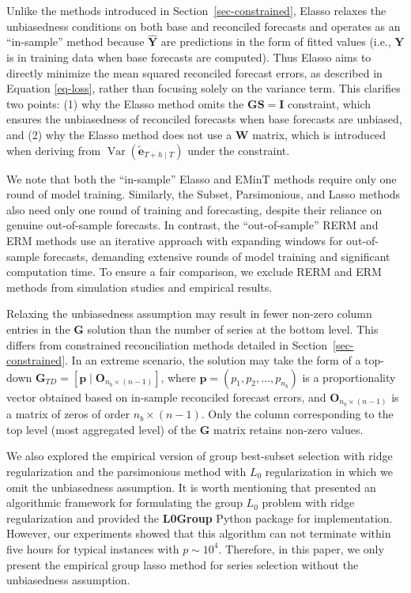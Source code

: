 \documentclass[
  11pt]{article}
\theoremstyle{plain}
\theoremstyle{remark}
\begin{document}
Unlike the methods introduced in Section~\ref{sec-constrained}, Elasso
relaxes the unbiasedness conditions on both base and reconciled
forecasts and operates as an ``in-sample'' method because
\(\hat{\bm{Y}}\) are predictions in the form of fitted values (i.e.,
\(\bm{Y}\) is in training data when base forecasts are computed). Thus
Elasso aims to directly minimize the mean squared reconciled forecast
errors, as described in Equation \eqref{eq-loss}, rather than focusing
solely on the variance term. This clarifies two points: (1) why the
Elasso method omits the \(\bm{GS}=\bm{I}\) constraint, which ensures the
unbiasedness of reconciled forecasts when base forecasts are unbiased,
and (2) why the Elasso method does not use a \(\bm{W}\) matrix, which is
introduced when deriving from
\(\operatorname{Var}(\tilde{\bm{e}}_{T+h \mid T})\) under the
constraint.

We note that both the ``in-sample'' Elasso and EMinT methods require
only one round of model training. Similarly, the Subset, Parsimonious,
and Lasso methods also need only one round of training and forecasting,
despite their reliance on genuine out-of-sample forecasts. In contrast,
the ``out-of-sample'' RERM and ERM methods use an iterative approach
with expanding windows for out-of-sample forecasts, demanding extensive
rounds of model training and significant computation time. To ensure a
fair comparison, we exclude RERM and ERM methods from simulation studies
and empirical results.

Relaxing the unbiasedness assumption may result in fewer non-zero column
entries in the \(\bm{G}\) solution than the number of series at the
bottom level. This differs from constrained reconciliation methods
detailed in Section~\ref{sec-constrained}. In an extreme scenario, the
solution may take the form of a top-down
\(\bm{G}_{TD}=[\bm{p} \mid \bm{O}_{n_b \times (n-1)}]\), where
\(\bm{p} = (p_1, p_2, \ldots, p_{n_b})\) is a proportionality vector
obtained based on in-sample reconciled forecast errors, and
\(\bm{O}_{n_b \times (n-1)}\) is a matrix of zeros of order
\(n_b \times (n-1)\). Only the column corresponding to the top level
(most aggregated level) of the \(\bm{G}\) matrix retains non-zero
values.

We also explored the empirical version of group best-subset selection
with ridge regularization and the parsimonious method with \(L_0\)
regularization in which we omit the unbiasedness assumption. It is worth
mentioning that \citet{Hazimeh2023-ie} presented an algorithmic
framework for formulating the group \(L_0\) problem with ridge
regularization and provided the \textbf{L0Group} Python package for
implementation. However, our experiments showed that this algorithm can
not terminate within five hours for typical instances with
\(p \sim 10^4\). Therefore, in this paper, we only present the empirical
group lasso method for series selection without the unbiasedness
assumption.
\end{document}
